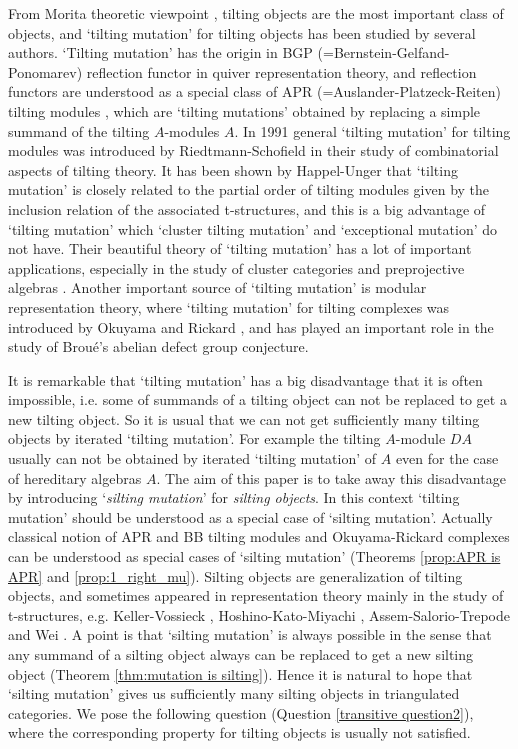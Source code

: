 \documentclass[a4paper,reqno]{amsart}
\theoremstyle{definition}
\begin{document}
From Morita theoretic viewpoint \cite{Ric1}, tilting objects are the most important
class of objects, and `tilting mutation' for tilting objects has
been studied by several authors. `Tilting mutation' has the origin in
BGP (=Bernstein-Gelfand-Ponomarev) reflection functor \cite{BGP} in quiver
representation theory, and reflection functors are understood as a special class
of APR (=Auslander-Platzeck-Reiten) tilting modules \cite{APR},
which are `tilting mutations' obtained by replacing a simple summand of
the tilting $A$-modules $A$. In 1991 general `tilting mutation' for tilting modules was
introduced by Riedtmann-Schofield \cite{RS} in their study of combinatorial aspects
of tilting theory. It has been shown by Happel-Unger \cite{HU} that `tilting mutation'
is closely related to the partial order of tilting modules given by the inclusion
relation of the associated t-structures, and this is a big advantage of `tilting mutation'
which `cluster tilting mutation' and `exceptional mutation' do not have.
Their beautiful theory of `tilting mutation' has a lot of important applications, especially in the study of
cluster categories and preprojective algebras \cite{BMRRT,IR,BIRS,BIKR,SY}.
Another important source of `tilting mutation' is modular representation theory, 
where `tilting mutation' for tilting complexes was introduced by 
Okuyama and Rickard \cite{O,Ric2,HK}, and has played an important role 
in the study of Brou\'e's abelian defect group conjecture.

It is remarkable that `tilting mutation' has a big disadvantage
that it is often impossible, i.e. some of summands of a tilting
object can not be replaced to get a new tilting object. So it is usual that we can not
get sufficiently many tilting objects by iterated `tilting mutation'.
For example the tilting $A$-module $DA$ usually can not be obtained by
iterated `tilting mutation' of $A$ even for the case of hereditary algebras $A$.
The aim of this paper is to take away this disadvantage by introducing 
`\emph{silting mutation}' for \emph{silting objects}. In this context
`tilting mutation' should be understood as a special case of `silting mutation'.
Actually classical notion of APR and BB tilting modules and Okuyama-Rickard complexes
can be understood as special cases of `silting mutation'  (Theorems \ref{prop:APR is APR} and \ref{prop:1_right_mu}).
Silting objects are generalization of tilting objects,
and sometimes appeared in representation theory mainly in the study of
t-structures, e.g. Keller-Vossieck \cite{KV}, 
Hoshino-Kato-Miyachi \cite{HKM}, Assem-Salorio-Trepode \cite{AST} and Wei \cite{W}.
A point is that `silting mutation' is always possible in the sense that
any summand of a silting object always can be replaced to get a new
silting object (Theorem \ref{thm:mutation is silting}).  
Hence it is natural to hope that `silting mutation' gives us sufficiently many
silting objects in triangulated categories. We pose the following question
(Question \ref{transitive question2}),
where the corresponding property for tilting objects is usually not satisfied.
\end{document}
